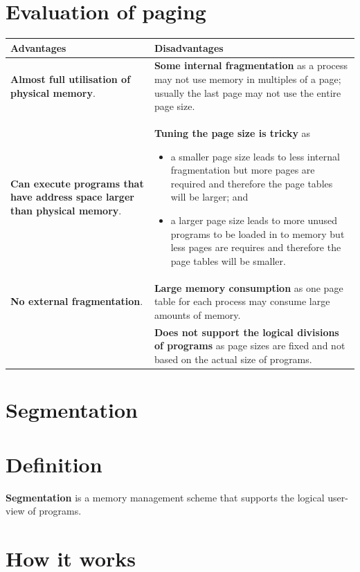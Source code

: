 \documentclass[a4paper]{systems-software}
\begin{document}
\section*{Evaluation of paging}

\begin{longtabu} to \textwidth {| X[1,l] | X[1,l] |}
    \hline
    \textbf{Advantages} & \textbf{Disadvantages}
	\\ \hline
	\textbf{Almost full utilisation of physical memory}. &
	\textbf{Some internal fragmentation} as a process may not use memory in multiples of a page; usually the last page may not use the entire page size.
	\\ \hline
	\textbf{Can execute programs that have address space larger than physical memory}. &
	\textbf{Tuning the page size is tricky} as
	\begin{itemize}
		\item a smaller page size leads to less internal fragmentation but more pages are required and therefore the page tables will be larger; and
		\item a larger page size leads to more unused programs to be loaded in to memory but less pages are requires and therefore the page tables will be smaller.
	\end{itemize}
	\\ \hline
	\textbf{No external fragmentation}. & 
	\textbf{Large memory consumption} as one page table for each process may consume large amounts of memory.
	\\ \hline
	& \textbf{Does not support the logical divisions of programs} as page sizes are fixed and not based on the actual size of programs.
	\\ \hline
\end{longtabu}


\newpage

\section{Segmentation}

\section*{Definition}

\textbf{Segmentation} is a memory management scheme that supports the logical user-view of programs.


\section*{How it works}
\end{document}
